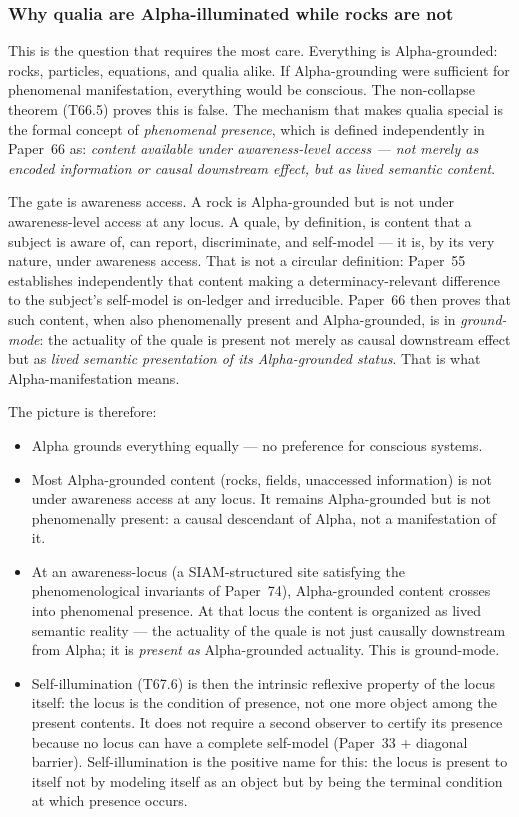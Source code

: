 \documentclass[11pt]{article}
\theoremstyle{remark}
\begin{document}
\subsubsection*{Why qualia are Alpha-illuminated while rocks are not}\label{sec:illumination-mechanism}

This is the question that requires the most care. Everything is Alpha-grounded: rocks,
particles, equations, and qualia alike. If Alpha-grounding were sufficient for
phenomenal manifestation, everything would be conscious. The non-collapse theorem
(T66.5) proves this is false. The mechanism that makes qualia special is the formal
concept of \emph{phenomenal presence}, which is defined independently in Paper~66 as:
\emph{content available under awareness-level access --- not merely as encoded
information or causal downstream effect, but as lived semantic content}.

The gate is awareness access. A rock is Alpha-grounded but is not under
awareness-level access at any locus. A quale, by definition, is content that a
subject is aware of, can report, discriminate, and self-model --- it is, by its
very nature, under awareness access. That is not a circular definition: Paper~55
establishes independently that content making a determinacy-relevant difference to
the subject's self-model is on-ledger and irreducible. Paper~66 then proves that
such content, when also phenomenally present and Alpha-grounded, is in
\emph{ground-mode}: the actuality of the quale is present not merely as causal
downstream effect but as \emph{lived semantic presentation of its Alpha-grounded
status}. That is what Alpha-manifestation means.

The picture is therefore:
\begin{itemize}
  \item Alpha grounds everything equally --- no preference for conscious systems.
  \item Most Alpha-grounded content (rocks, fields, unaccessed information) is
    not under awareness access at any locus. It remains Alpha-grounded but is not
    phenomenally present: a causal descendant of Alpha, not a manifestation of it.
  \item At an awareness-locus (a SIAM-structured site satisfying the
    phenomenological invariants of Paper~74), Alpha-grounded content crosses into
    phenomenal presence. At that locus the content is organized as lived semantic
    reality --- the actuality of the quale is not just causally downstream from Alpha;
    it is \emph{present as} Alpha-grounded actuality. This is ground-mode.
  \item Self-illumination (T67.6) is then the intrinsic reflexive property of
    the locus itself: the locus is the condition of presence, not one more object
    among the present contents. It does not require a second observer to certify its
    presence because no locus can have a complete self-model (Paper~33 + diagonal
    barrier). Self-illumination is the positive name for this: the locus is present
    to itself not by modeling itself as an object but by being the terminal condition
    at which presence occurs.
\end{itemize}
\end{document}
